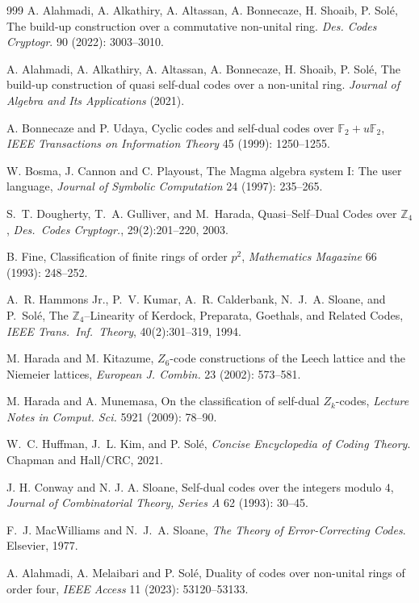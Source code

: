 \documentclass[11pt,a4paper]{article}
\theoremstyle{definition}
\numberwithin{equation}{section}
\begin{document}
\begin{thebibliography}{999}
A. Alahmadi, A. Alkathiry, A. Altassan, A. Bonnecaze, H. Shoaib, P. Solé,
The build-up construction over a commutative non-unital ring.
{\em Des. Codes Cryptogr}. 90 (2022): 3003–3010.

A. Alahmadi, A. Alkathiry, A. Altassan, A. Bonnecaze, H. Shoaib, P. Solé,
The build-up construction of quasi self-dual codes over a non-unital ring.
{\em Journal of Algebra and Its Applications} (2021).


A. Bonnecaze and P. Udaya,
Cyclic codes and self-dual codes over $\mathbb{F}_{2}+u\mathbb{F}_{2}$,
{\em IEEE Transactions on Information Theory} 45 (1999): 1250–1255.

W. Bosma, J. Cannon and C. Playoust,
The Magma algebra system I: The user language,
{\em Journal of Symbolic Computation} 24 (1997): 235–265.

S.~T. Dougherty, T.~A. Gulliver, and M.~Harada,
Quasi–Self–Dual Codes over $\mathbb{Z}_4$,
\emph{Des.\ Codes Cryptogr.}, 29(2):201–220, 2003.

B. Fine,
Classification of finite rings of order $p^2$,
{\em Mathematics Magazine} 66 (1993): 248–252.

A.~R. Hammons Jr., P.~V. Kumar, A.~R. Calderbank, N.~J.~A. Sloane, and P.~Solé,
The $\mathbb{Z}_4$–Linearity of Kerdock, Preparata, Goethals, and Related Codes,
\emph{IEEE Trans.\ Inf.\ Theory}, 40(2):301–319, 1994.

M. Harada and M. Kitazume,
$Z_6$-code constructions of the Leech lattice and the Niemeier lattices,
{\em European J. Combin.} 23 (2002): 573–581.

M. Harada and A. Munemasa,
On the classification of self-dual $Z_k$-codes,
{\em Lecture Notes in Comput. Sci.} 5921 (2009): 78–90.

W.~C. Huffman, J.~L. Kim, and P. Solé,
\emph{Concise Encyclopedia of Coding Theory}.
Chapman and Hall/CRC, 2021.

J. H. Conway and N. J. A. Sloane,
Self-dual codes over the integers modulo $4$,
{\em Journal of Combinatorial Theory, Series A} 62 (1993): 30–45.

F.~J. MacWilliams and N.~J.~A. Sloane,
\emph{The Theory of Error-Correcting Codes}.
Elsevier, 1977.

A. Alahmadi, A. Melaibari and P. Solé,
Duality of codes over non-unital rings of order four,
{\em IEEE Access} 11 (2023): 53120–53133.


\end{thebibliography}
\end{document}
